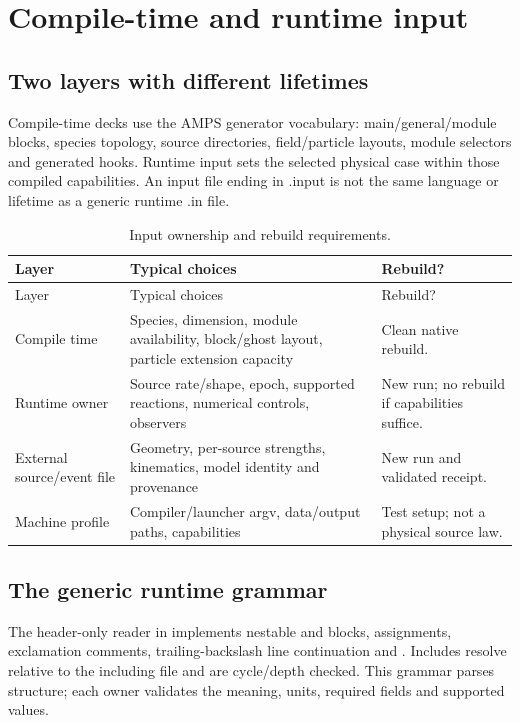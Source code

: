 \chapter{Compile-time and runtime input}\label{ch:inputs}
\section{Two layers with different lifetimes}
Compile-time decks use the AMPS generator vocabulary: main/general/module
blocks, species topology, source directories, field/particle layouts, module
selectors and generated hooks. Runtime input sets the selected physical case
within those compiled capabilities. An input file ending in .input is not the
same language or lifetime as a generic runtime .in file.

\begin{longtable}{L{0.24\textwidth}L{0.43\textwidth}L{0.20\textwidth}}
\caption{Input ownership and rebuild requirements.}\\
\toprule Layer & Typical choices & Rebuild?\\\midrule\endfirsthead
\toprule Layer & Typical choices & Rebuild?\\\midrule\endhead
Compile time & Species, dimension, module availability, block/ghost layout,
particle extension capacity & Clean native rebuild.\\
Runtime owner & Source rate/shape, epoch, supported reactions, numerical
controls, observers & New run; no rebuild if capabilities suffice.\\
External source/event file & Geometry, per-source strengths, kinematics,
model identity and provenance & New run and validated receipt.\\
Machine profile & Compiler/launcher argv, data/output paths, capabilities &
Test setup; not a physical source law.\\
\bottomrule
\end{longtable}

\section{The generic runtime grammar}
The header-only reader in  implements
nestable  and  blocks,
 assignments, exclamation comments, trailing-backslash line
continuation and . Includes resolve relative to the
including file and are cycle/depth checked. This grammar parses structure;
each owner validates the meaning, units, required fields and supported values.


